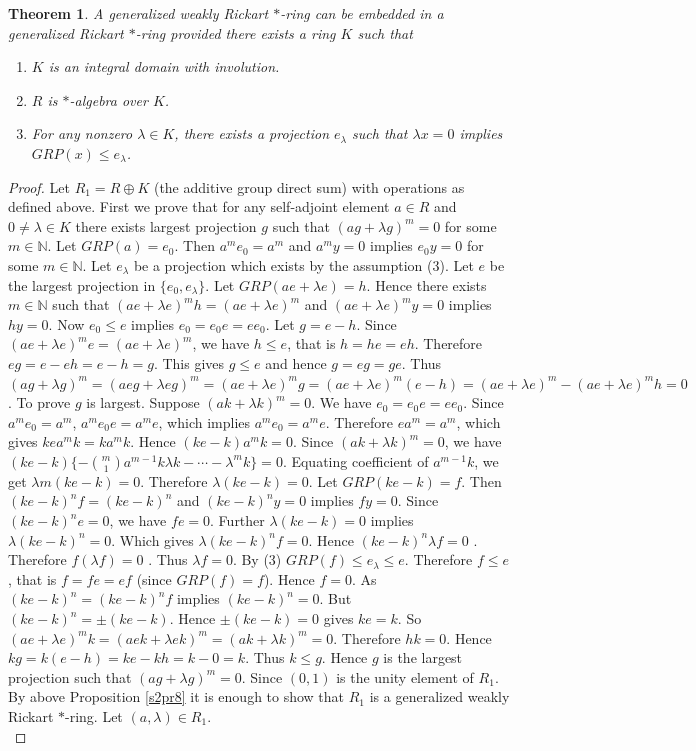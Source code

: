 \documentclass[11pt, one side,emlines]{amsart}
\newtheorem{theorem}[lemma]{Theorem}
\theoremstyle{definition}
\numberwithin{equation}{section} \thispagestyle{empty} \voffset
\begin{document}
\begin{theorem}  A generalized weakly Rickart $*$-ring can be embedded in a generalized Rickart $*$-ring
provided there exists a ring $K$ such that
\begin{enumerate}
	\item  $K$ is an integral domain with involution.
	\item  $R$ is $*$-algebra over $K$. 
	\item  For any nonzero $\lambda\in K$, there exists a projection $e_\lambda$ such that $\lambda x=0$ implies   $GRP(x)\leq e_\lambda$.
\end{enumerate}
\end{theorem}
\begin{proof} Let $ R_1 = R\oplus K$ (the additive group direct sum) with operations as defined above. First we prove that for any self-adjoint element $a\in R$ and $0 \ne \lambda \in K$ there exists largest projection $g$ such that $(ag+\lambda g)^m=0$ for some $m\in\mathbb N $. Let $GRP(a)=e_0$.
	Then  $a^me_0=a^m$ and $a^my=0$ implies $e_0y=0$ for some $m\in\mathbb N$. 
	Let $e_\lambda$ be a projection which exists by the assumption (3).
	Let $e$ be the largest projection in $\{e_0,e_\lambda\}$.
	Let $GRP(ae+\lambda e)=h$. Hence there exists $ m\in\mathbb N$ such that $(ae+\lambda e)^mh=(ae+\lambda e)^m$ and  $(ae+\lambda e)^my=0$ implies $hy=0$.  Now $e_0\leq e$ implies $e_0=e_0e=ee_0$.
	Let $g = e-h$.	Since $(ae+\lambda e)^me=(ae+\lambda e)^m$, we have $h\leq e$, that is $h=he =eh$. Therefore $eg=e-eh=e-h=g$. This gives $g\leq e$ and hence $g=eg=ge$.
	Thus $(ag+\lambda g)^m=(a eg+\lambda eg)^m=(ae+\lambda e)^mg
	=(ae+\lambda e)^m(e-h)=(ae+\lambda e)^m-(ae+\lambda e)^mh=0$.
	To prove $g$ is largest. Suppose $(ak+\lambda k)^m=0$. We have $e_0=e_0e=ee_0$. Since $a^me_0=a^m$, $a^me_0e=a^me$, which implies $a^me_0=a^me$. Therefore $ea^m=a^m$, which gives $kea^mk=ka^mk$. Hence $(ke-k)a^mk=0$. Since $(ak+\lambda k)^m=0$, we have $(ke-k)\{-\binom{m}{1}a^{m-1}k\lambda k-\cdots-\lambda^mk\}=0$. Equating coefficient of $a^{m-1}k$, we get  $\lambda m (ke-k)=0$. 
	Therefore $\lambda (ke-k)=0$. Let $GRP(ke-k)=f$. Then $(ke-k)^nf=	(ke-k)^n $ and $(ke-k)^ny=0$ implies  $fy=0$. Since $(ke-k)^ne=0$, we have $fe=0$. Further $\lambda (ke-k)=0$ implies $\lambda (ke-k)^n=0$.  Which gives $\lambda (ke-k)^nf=0$. Hence $ (ke-k)^n\lambda f=0$ . Therefore $f(\lambda f)=0$ . Thus $\lambda f=0$. By (3) $GRP(f)\leq e_\lambda\leq e$. Therefore $f\leq e$, that is $f=fe=ef$ (since $GRP(f)=f$). Hence $f=0$. As $(ke-k)^n= (ke-k)^nf$ implies $(ke-k)^n=0$. But $(ke-k)^n=\pm (ke-k)$. Hence $\pm (ke-k) =0$ gives $ke=k$. So $(ae+\lambda e)^m k=(aek+\lambda ek)^m=(ak+\lambda k)^m=0$. Therefore $hk=0$. Hence $kg=k(e-h)=ke-kh=k-0=k$. Thus $k\leq g$. Hence $g$ is the largest projection  such that $(ag+\lambda g)^m=0$.  Since $(0,1)$ is the unity element of $R_1$. By above Proposition \ref{s2pr8}  it is enough to show that $R_1$ is a generalized weakly Rickart $*$-ring. Let $(a,\lambda)\in R_1$.\\

\end{proof}
\end{document}
